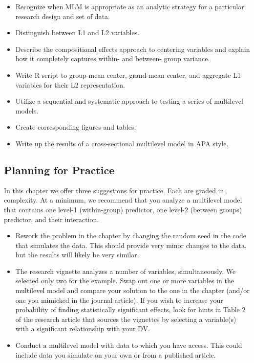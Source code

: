 \documentclass[
  english,
]{book}
\providecommand{\tightlist}{%
  \setlength{\itemsep}{0pt}\setlength{\parskip}{0pt}}
\begin{document}
\begin{itemize}
\tightlist
\item
  Recognize when MLM is appropriate as an analytic strategy for a particular research design and set of data.
\item
  Distinguish between L1 and L2 variables.
\item
  Describe the compositional effects approach to centering variables and explain how it completely captures within- and between- group variance.
\item
  Write R script to group-mean center, grand-mean center, and aggregate L1 variables for their L2 representation.
\item
  Utilize a sequential and systematic approach to testing a series of multilevel models.
\item
  Create corresponding figures and tables.
\item
  Write up the results of a cross-sectional multilevel model in APA style.
\end{itemize}

\hypertarget{planning-for-practice}{%
\subsection{Planning for Practice}\label{planning-for-practice}}

In this chapter we offer three suggestions for practice. Each are graded in complexity. At a minimum, we recommend that you analyze a multilevel model that contains one level-1 (within-group) predictor, one level-2 (between groups) predictor, and their interaction.

\begin{itemize}
\tightlist
\item
  Rework the problem in the chapter by changing the random seed in the code that simulates the data. This should provide very minor changes to the data, but the results will likely be very similar.
\item
  The research vignette analyzes a number of variables, simultaneously. We selected only two for the example. Swap out one or more variables in the multilevel model and compare your solution to the one in the chapter (and/or one you mimicked in the journal article). If you wish to increase your probability of finding statistically significant effects, look for hints in Table 2 of the \citep{lefevor_homonegativity_2020} research article that sources the vignettes by selecting a variable(s) with a significant relationship with your DV.
\item
  Conduct a multilevel model with data to which you have access. This could include data you simulate on your own or from a published article.
\end{itemize}
\end{document}
